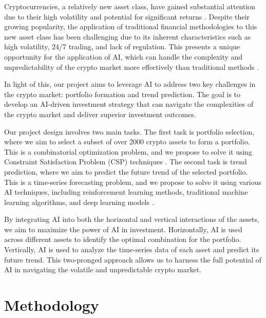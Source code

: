 \documentclass[journal]{IEEEtran}
\begin{document}
Cryptocurrencies, a relatively new asset class, have gained substantial attention due to their high volatility and potential for significant returns \cite{10356083}. Despite their growing popularity, the application of traditional financial methodologies to this new asset class has been challenging due to its inherent characteristics such as high volatility, 24/7 trading, and lack of regulation. This presents a unique opportunity for the application of AI, which can handle the complexity and unpredictability of the crypto market more effectively than traditional methods \cite{hansun2022multivariate}.

In light of this, our project aims to leverage AI to address two key challenges in the crypto market: portfolio formation and trend prediction. The goal is to develop an AI-driven investment strategy that can navigate the complexities of the crypto market and deliver superior investment outcomes.

Our project design involves two main tasks. The first task is portfolio selection, where we aim to select a subset of over 2000 crypto assets to form a portfolio. This is a combinatorial optimization problem, and we propose to solve it using Constraint Satisfaction Problem (CSP) techniques \cite{gunjan2023brief}. The second task is trend prediction, where we aim to predict the future trend of the selected portfolio. This is a time-series forecasting problem, and we propose to solve it using various AI techniques, including reinforcement learning methods, traditional machine learning algorithms, and deep learning models \cite{zhang2022deep, lim2022dynamic}.

By integrating AI into both the horizontal and vertical interactions of the assets, we aim to maximize the power of AI in investment. Horizontally, AI is used across different assets to identify the optimal combination for the portfolio. Vertically, AI is used to analyze the time-series data of each asset and predict its future trend. This two-pronged approach allows us to harness the full potential of AI in navigating the volatile and unpredictable crypto market.

\section{Methodology}
\end{document}
